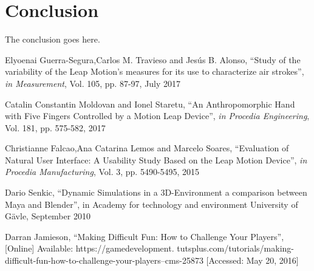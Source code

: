 \documentclass[journal]{IEEEtran}										    %
\begin{document}
        \section{Conclusion}
            The conclusion goes here.

        
        \begin{thebibliography}{1}

                Elyoenai Guerra-Segura,Carlos M. Travieso and Jesús B. Alonso, “Study of the 
                variability of the Leap Motion’s measures for its use to characterize air strokes”, 
                \emph{in Measurement}, Vol. 105, pp. 87-97, July 2017
                
                
                Catalin Constantin Moldovan and Ionel Staretu, “An Anthropomorphic Hand with Five 
                Fingers Controlled by a Motion Leap Device”, \emph{in Procedia Engineering}, Vol. 181, 
                pp. 575-582, 2017
                

                Christianne Falcao,Ana Catarina Lemos and Marcelo Soares, “Evaluation of Natural User 
                Interface: A Usability Study Based on the Leap Motion Device”, 
                \emph{in Procedia Manufacturing}, Vol. 3, pp. 5490-5495, 2015
            
                Dario Senkic, “Dynamic Simulations in a 3D-Environment a comparison between Maya
                and Blender”, in Academy for technology and environment University of Gävle, 
                September 2010

                Darran Jamieson, “Making Difficult Fun: How to Challenge Your Players”, [Online]
                Available: https://gamedevelopment.
                tutsplus.com/tutorials/making-difficult-fun-how-to-challenge-your-players--cms-25873 [Accessed: May 20, 2016]
            
            
        \end{thebibliography}
\end{document}
